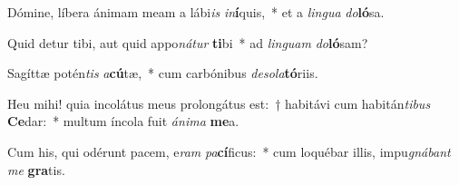 \item Dómine, líbera ánimam meam a lábi\textit{is} \textit{in}\textbf{í}quis,~* et a \textit{lin}\textit{gua} \textit{do}\textbf{ló}sa.
\item Quid detur tibi, aut quid appo\textit{ná}\textit{tur} \textbf{ti}bi~* ad \textit{lin}\textit{guam} \textit{do}\textbf{ló}sam?
\item Sagíttæ potén\textit{tis} \textit{a}\textbf{cú}tæ,~* cum carbónibus \textit{de}\textit{so}\textit{la}\textbf{tó}riis.
\item Heu mihi! quia incolátus meus prolongátus est:~† habitávi cum habitán\textit{ti}\textit{bus} \textbf{Ce}dar:~* multum íncola fuit \textit{á}\textit{ni}\textit{ma} \textbf{me}a.
\item Cum his, qui odérunt pacem, e\textit{ram} \textit{pa}\textbf{cí}ficus:~* cum loquébar illis, impu\textit{gná}\textit{bant} \textit{me} \textbf{gra}tis.
